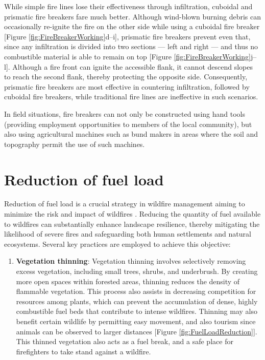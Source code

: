\documentclass[
  12 pt,
]{Nemilov}
\providecommand{\tightlist}{%
  \setlength{\itemsep}{0pt}\setlength{\parskip}{0pt}}
\begin{document}
While simple fire lines lose their effectiveness through infiltration, cuboidal and prismatic fire breakers fare much better. Although wind-blown burning debris can occasionally re-ignite the fire on the other side while using a cuboidal fire breaker {[}Figure \ref{fig:FireBreakerWorking}d--i{]}, prismatic fire breakers prevent even that, since any infiltration is divided into two sections --- left and right --- and thus no combustible material is able to remain on top {[}Figure \ref{fig:FireBreakerWorking}j--l{]}. Although a fire front can ignite the accessible flank, it cannot descend slopes to reach the second flank, thereby protecting the opposite side. Consequently, prismatic fire breakers are most effective in countering infiltration, followed by cuboidal fire breakers, while traditional fire lines are ineffective in such scenarios.

In field situations, fire breakers can not only be constructed using hand tools (providing employment opportunities to members of the local community), but also using agricultural machines such as bund makers in areas where the soil and topography permit the use of such machines.

\section{Reduction of fuel load}\label{reduction-of-fuel-load}

Reduction of fuel load is a crucial strategy in wildfire management aiming to minimize the risk and impact of wildfires \citep{brodie2024forest}. Reducing the quantity of fuel available to wildfires can substantially enhance landscape resilience, thereby mitigating the likelihood of severe fires and safeguarding both human settlements and natural ecosystems. Several key practices are employed to achieve this objective:

\begin{enumerate}
\def\labelenumi{\arabic{enumi}.}
\tightlist
\item
  \textbf{Vegetation thinning}: Vegetation thinning involves selectively removing excess vegetation, including small trees, shrubs, and underbrush. By creating more open spaces within forested areas, thinning reduces the density of flammable vegetation. This process also assists in decreasing competition for resources among plants, which can prevent the accumulation of dense, highly combustible fuel beds that contribute to intense wildfires. Thinning may also benefit certain wildlife by permitting easy movement, and also tourism since animals can be observed to larger distances {[}Figure \ref{fig:FuelLoadReduction}{]}. This thinned vegetation also acts as a fuel break, and a safe place for firefighters to take stand against a wildfire.
\end{enumerate}
\end{document}
